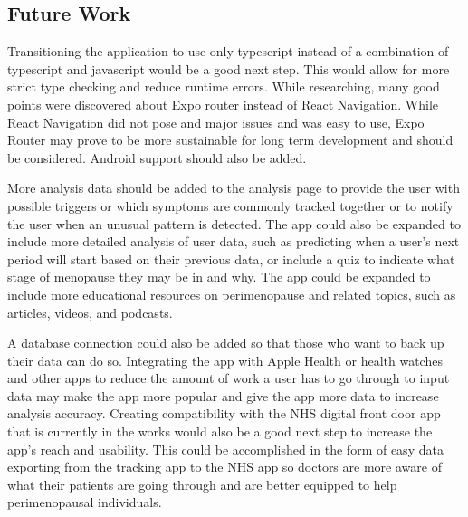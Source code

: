 \subsection{Future Work}
Transitioning the application to use only typescript instead of a combination of typescript and javascript would be a good next step. This would allow for more strict type checking and reduce runtime errors. While researching, many good points were discovered about Expo router instead of React Navigation. While React Navigation did not pose and major issues and was easy to use, Expo Router may prove to be more sustainable for long term development and should be considered. Android support should also be added.

More analysis data should be added to the analysis page to provide the user with possible triggers or which symptoms are commonly tracked together or to notify the user when an unusual pattern is detected. The app could also be expanded to include more detailed analysis of user data, such as predicting when a user's next period will start based on their previous data, or include a quiz to indicate what stage of menopause they may be in and why. The app could be expanded to include more educational resources on perimenopause and related topics, such as articles, videos, and podcasts. 

A database connection could also be added so that those who want to back up their data can do so. Integrating the app with Apple Health or health watches and other apps to reduce the amount of work a user has to go through to input data may make the app more popular and give the app more data to increase analysis accuracy. Creating compatibility with the NHS digital front door app that is currently in the works would also be a good next step to increase the app's reach and usability. This could be accomplished in the form of easy data exporting from the tracking app to the NHS app so doctors are more aware of what their patients are going through and are better equipped to help perimenopausal individuals.
